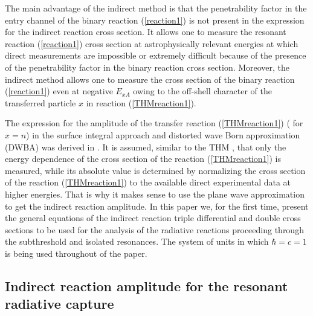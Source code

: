 \documentclass[prl,unsortedaddress,groupedaddress,twocolumn,amsmath,amsfonts,amssymb,showpacs,floatfix,nofootinbib]{revtex4}
\begin{document}
The main advantage of the indirect method is that the penetrability factor in the entry channel of the binary reaction (\ref{reaction1}) is not present in the expression for the indirect reaction cross section. It allows one to measure the resonant reaction  (\ref{reaction1}) cross section at astrophysically relevant energies at which direct  measurements are impossible or extremely difficult  because of the presence of the penetrability factor in the binary reaction cross section. Moreover, the indirect method allows one to measure the cross section of the binary reaction (\ref{reaction1}) even at negative $E_{xA}$ owing to the off-shell character of the transferred particle $x$ in reaction (\ref{THMreaction1}).

The expression for the amplitude of the transfer reaction (\ref{THMreaction1}) ( for $x=n$)  in the surface integral approach and distorted wave Born approximation (DWBA) was derived in \cite{muk2011}. It is assumed, similar to the THM \cite{reviewpaper}, that only the energy dependence  of the cross section of the reaction (\ref{THMreaction1}) is  measured, while its absolute value  is determined by normalizing  the  cross section of the reaction (\ref{THMreaction1})  to the available direct experimental data at higher energies. That is why it makes sense to use the plane wave approximation to get the indirect reaction amplitude.
In this paper we, for the first time, present the general equations of the indirect reaction triple differential and double cross sections to be used for the analysis of the radiative reactions proceeding through the subthreshold and isolated resonances.
The system of units in which $\hbar=c=1$ is being used throughout of the paper.

\subsection{Indirect reaction amplitude for the  resonant radiative capture}
\end{document}
